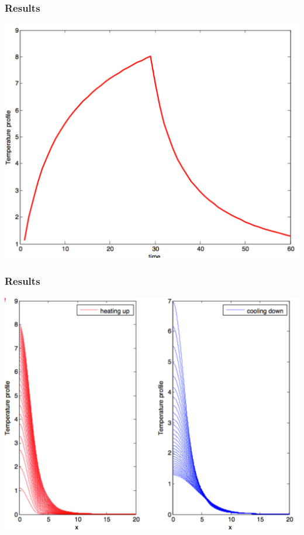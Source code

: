 \documentclass{beamer}
\begin{document}
\begin{frame}
\frametitle{Results}
\begin{center}
\includegraphics[scale = 0.28 ]{Pages/Temperature_profile_Jessica.pdf}
\end{center}
\end{frame}
\begin{frame}
\frametitle{Results}
\begin{center}
\includegraphics[scale = 0.3]{Pages/heating_cooling_Jessica.pdf}
\end{center}
\end{frame}
\end{document}

